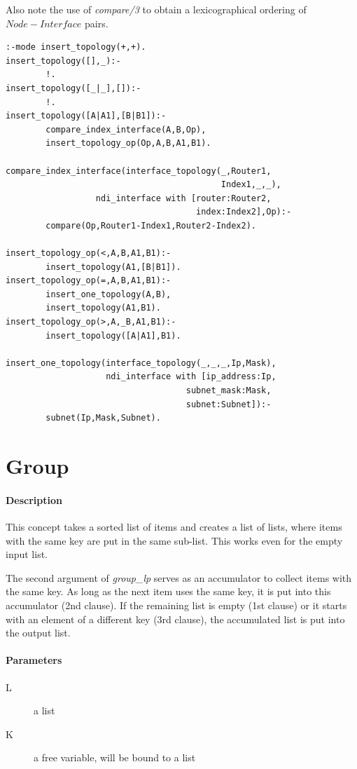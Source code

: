 \documentclass[a4paper,12pt]{report}
\begin{document}
Also note the use of {\it compare/3} to obtain a lexicographical ordering of $Node-Interface$ pairs.

\begin{verbatim}
:-mode insert_topology(+,+).
insert_topology([],_):-
        !.
insert_topology([_|_],[]):-
        !.
insert_topology([A|A1],[B|B1]):-
        compare_index_interface(A,B,Op),
        insert_topology_op(Op,A,B,A1,B1).

compare_index_interface(interface_topology(_,Router1,
                                           Index1,_,_),
                  ndi_interface with [router:Router2,
                                      index:Index2],Op):-
        compare(Op,Router1-Index1,Router2-Index2).

insert_topology_op(<,A,B,A1,B1):-
        insert_topology(A1,[B|B1]).
insert_topology_op(=,A,B,A1,B1):-
        insert_one_topology(A,B),
        insert_topology(A1,B1).
insert_topology_op(>,A,_B,A1,B1):-
        insert_topology([A|A1],B1).

insert_one_topology(interface_topology(_,_,_,Ip,Mask),
                    ndi_interface with [ip_address:Ip,
                                    subnet_mask:Mask,
                                    subnet:Subnet]):-
        subnet(Ip,Mask,Subnet).        
\end{verbatim}

\pagebreak
\section{Group}
\paragraph{Description}
This concept takes a sorted list of items and creates a list of lists, where items with the same key are put in the same sub-list. This works even for the empty input list.

The second argument of {\it group\_lp} serves as an accumulator to collect items with the same key. As long as the next item uses the same key, it is put into this accumulator (2nd clause). If the remaining list is empty (1st clause) or it starts with an element of a different key (3rd clause), the accumulated list is put into the output list.
\paragraph{Parameters}
\begin{description}
\item[L] a list
\item[K] a free variable, will be bound to a list
\end{description}
\end{document}
